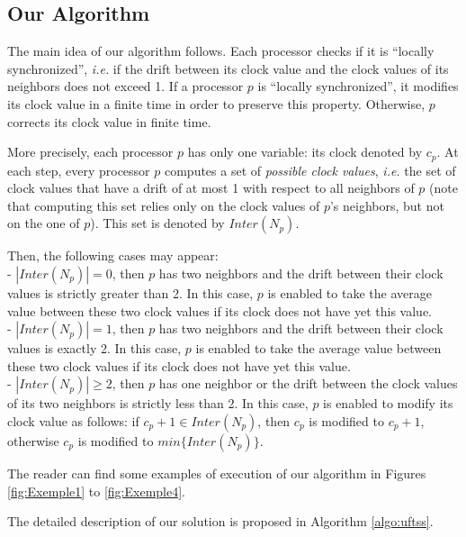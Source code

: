 \documentclass[11pt,english,letterpaper]{article}
\begin{document}
\subsection{Our Algorithm}

The main idea of our algorithm follows. Each processor checks if it is ``locally synchronized'', \emph{i.e.} if the drift between its clock value and the clock values of its neighbors does not exceed 1. If a processor $p$ is ``locally synchronized'', it modifies its clock value in a finite time in order to preserve this property. Otherwise, $p$ corrects its clock value in finite time. 

More precisely, each processor $p$ has only one variable: its clock denoted by $c_{p}$. At each step, every processor $p$ computes a set of \emph{possible clock values},	\emph{i.e.} the set of clock values that have a drift of at most 1 with respect to all neighbors of $p$ (note that computing this set relies only on the clock values of $p$'s neighbors, but not on the one of $p$). This set is denoted by $Inter(N_{p})$.

Then, the following cases may appear:\\
\indent - $|Inter(N_{p})|=0$, then $p$ has two neighbors and the drift between their clock values is strictly greater than 2. In this case, $p$ is enabled to take the average value between these two clock values if its clock does not have yet this value.\\
\indent - $|Inter(N_{p})|=1$, then $p$ has two neighbors and the drift between their clock values is exactly 2. In this case, $p$ is enabled	to take the average value between these two clock values if its clock does not have yet this value.\\
\indent - $|Inter(N_{p})|\geq 2$, then $p$ has one neighbor or the drift between the clock values of its two neighbors is strictly less than 2. In this case, $p$ is enabled to modify its clock value as follows: if $c_{p}+1\in Inter(N_{p})$, then $c_{p}$ is modified to $c_{p}+1$, otherwise $c_{p}$ is modified to $min\{Inter(N_{p})\}$.

The reader can find some examples of execution of our algorithm in Figures \ref{fig:Exemple1} to \ref{fig:Exemple4}.

The detailed description of our solution is proposed in Algorithm \ref{algo:uftss}.
\end{document}
